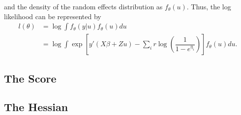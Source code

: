 \documentclass{article}
\begin{document}
        \noindent and the density of the random effects distribution as $f_\theta(u)$. Thus, the log likelihood can be represented by 
        \begin{align}
        l(\theta) &= \log \int f_{\theta}(y|u)f_\theta(u) du \\
        &= \log\int \exp \left[ y' (X \beta + Z u) - \sum_i r \log \left( \dfrac{1}{1-e^{\eta_i}} \right) \right]  f_\theta(u)du.
        \end{align}
        
        \begin{comment}
        \noindent and the score vector is
        \begin{align}
        S(\beta_j) &= \dfrac{\partial}{\partial\beta} \log L(\theta|y) \\
        &= \sum\limit_{i=1}^n \alpha X [\dfrac{y_i-exp(X\beta + Z u)}{exp(X\beta + Z u) + \alpha}] 
        \end{align}
        \begin{align}
        S(\alpha) &= \dfrac{\partial}{\partial\alpha} \log L(\theta|y) \\
        &= \sum\limits_{i=1}^n \psi(y_i + \alpha) - \psi(\alpha) + \log(\alpha) + 1 - \log(exp(X\beta + Z u) + \alpha) - \dfrac{y_i + \alpha}{exp(X\beta + Z u)+\alpha}
        \end{align}
        \noindent where $\psi(w)=\dfrac{\partial}{\partial w}\log\Gamma(w)$.
        \end{comment}
        
        \subsection{The Score}
        
        \subsection{The Hessian}
\end{document}
